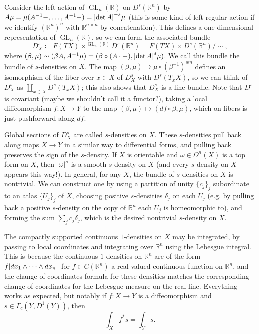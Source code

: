 \documentclass[11pt,leqno]{article}
\theoremstyle{plain}
\theoremstyle{definition}
\numberwithin{equation}{section}
\numberwithin{lem}{section}
\DeclareMathOperator{\GL}{GL}
\begin{document}
Consider the left action of $\GL_n(\mathbb R)$ on $D^s(\mathbb R^n)$ by $A\mu = \mu(A^{-1}-,\dots,A^{-1}-) = \abs{\det A}^{-s}\mu$ (this is some kind of left regular action if we identify $(\mathbb R^n)^n$ with $\mathbb R^{n\times n}$ by concatenation). This defines a one-dimensional representation of $\GL_n(\mathbb R)$, so we can form the associated bundle
\[D^s_X\coloneqq F(TX)\times^{\GL_n(\mathbb R)}D^s(\mathbb R^n) = F(TX)\times D^s(\mathbb R^n)/\sim,\]
where $(\beta,\mu)\sim (\beta A,A^{-1}\mu)=(\beta\circ (A\cdot-), \abs{\det A}^s\mu)$. We call this bundle the bundle of $s$-densities on $X$. The map $(\beta,\mu)\mapsto \mu\circ (\beta^{-1})^{\oplus n}$ defines an isomorphism of the fiber over $x\in X$ of $D^s_X$ with $D^s(T_xX)$, so we can think of $D^s_X$ as $\coprod_{x\in X}D^s(T_xX)$; this also shows that $D^s_X$ is a line bundle. Note that $D^s_{-}$ is covariant (maybe we shouldn't call it a functor?), taking a local diffeomorphism $f\colon X\to Y$ to the map $(\beta,\mu)\mapsto (df\circ\beta,\mu)$, which on fibers is just pushforward along $df$.

Global sections of $D^s_X$ are called $s$-densities on $X$. These $s$-densities pull back along maps $X\to Y$ in a similar way to differential forms, and pulling back preserves the sign of the $s$-density. If $X$ is orientable and $\omega\in \Omega^n(X)$ is a top form on $X$, then $\abs{\omega}^s$ is a smooth $s$-density on $X$ (and every $s$-density on $X$ appears this way!). In general, for any $X$, the bundle of $s$-densities on $X$ is nontrivial. We can construct one by using a partition of unity $\{c_j\}_j$ subordinate to an atlas $\{U_j\}_j$ of $X$, choosing positive $s$-densities $\delta_j$ on each $U_j$ (e.g. by pulling back a positive $s$-density on the copy of $\mathbb R^n$ each $U_j$ is homeomorphic to), and forming the sum $\sum_j c_j\delta_j$, which is the desired nontrivial $s$-density on $X$.

The compactly supported continuous $1$-densities on $X$ may be integrated, by passing to local coordinates and integrating over $\mathbb R^n$ using the Lebesgue integral. This is because the continuous $1$-densities on $\mathbb R^n$ are of the form $f\abs{dx_1\wedge \cdots \wedge dx_n}$ for $f\in C(\mathbb R^n)$ a real-valued continuous function on $\mathbb R^n$, and the change of coordinates formula for these densities matches the corresponding change of coordinates for the Lebesgue measure on the real line. Everything works as expected, but notably if $f\colon X\to Y$ is a diffeomorphism and $s\in \Gamma_c(Y,D^1(Y))$, then 
\[\int_X f^\ast s = \int_Y s.\]
\end{document}
